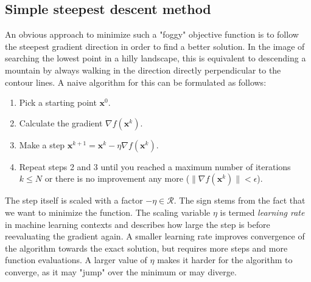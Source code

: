 \subsection{Simple steepest descent method}
An obvious approach to minimize such a "foggy" objective function is to follow the steepest gradient direction in order to find a better solution. In the image of searching the lowest point in a hilly landscape, this is equivalent to descending a mountain by always walking in the direction directly perpendicular to the contour lines. 
A naive algorithm for this can be formulated as follows:
\begin{enumerate}
    \item Pick a starting point $\mathbf{x}^0$.
    \item Calculate the gradient $\nabla f(\mathbf{x}^k)$.
    \item Make a step $\mathbf{x}^{k+1} = \mathbf{x}^k -\eta \nabla f(\mathbf{x}^k)$.
    \item Repeat steps 2 and 3 until you reached a maximum number of iterations $k \le N$ or there is no improvement any more ($ \lVert \nabla f(\mathbf{x}^k) \rVert < \epsilon$). 
\end{enumerate}
The step itself is scaled with a factor $-\eta \in \mathcal{R}$. The sign stems from the fact that we want to minimize the function. The scaling variable $\eta$ is termed \emph{learning rate} in machine learning contexts and describes how large the step is before reevaluating the gradient again. A smaller learning rate improves convergence of the algorithm towards the exact solution, but requires more steps and more function evaluations. A larger value of $\eta$ makes it harder for the algorithm to converge, as it may "jump" over the minimum or may diverge. 

